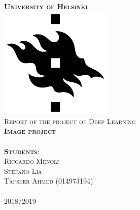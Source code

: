 \begin{titlepage}	
	\begin{center}
		
		\large{\huge \textbf{\textsc{University of Helsinki}}}
		~\\[1.0cm]
					
		\includegraphics[width=0.4\textwidth]{images/hy_logo} 
		~\\[1cm]
		
		\LARGE{\textsc{Report of the project of Deep Learning}}
		\HRuleThin		
		~\\[0.2cm]
				
		{\LARGE \textsc{\textbf{Image project}}}
		~\\[0.1cm]		

		\HRuleThin
		~\\[1.0cm]
		
		\textsc{\textbf{Students}: \\
		Riccardo Menoli \\
		Stefano Lia \\
		Tafseer Ahmed (014973194)\\ }
		~\\[0.2cm]
		\textsc{2018/2019}
	\end{center}

\end{titlepage}
